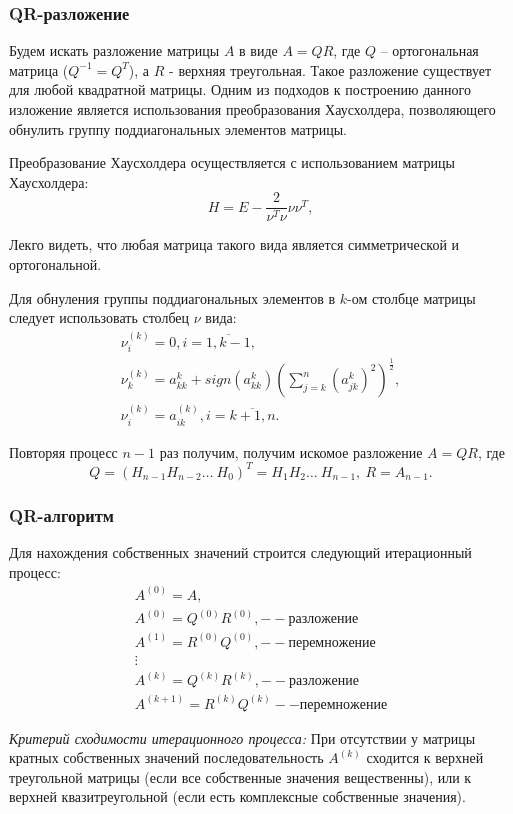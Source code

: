 \documentclass[a4paper,12pt]{article}
\begin{document}
\subsubsection{QR-разложение}
Будем искать разложение матрицы $A$ в виде
$A = QR$, где $Q$ -- ортогональная матрица ($Q^{-1} = Q^{T}$), а
$R$ - верхняя треугольная. Такое разложение существует для любой
квадратной матрицы. Одним из подходов к построению данного
изложение является использования преобразования Хаусхолдера,
позволяющего обнулить группу поддиагональных элементов матрицы.

Преобразование Хаусхолдера осуществляется с использованием
матрицы Хаусхолдера:
$$
H = E - \frac{2}{\nu^{T}\nu} \nu\nu^{T},
$$

Лекго видеть, что любая матрица такого вида является симметрической
и ортогональной.

Для обнуления группы поддиагональных элементов в $k$-ом столбце матрицы следует
использовать столбец $\nu$ вида:
$$
\begin{array}{l}
    \nu^{(k)}_i = 0, i = \overline{1, k - 1}, \\
    \nu^{(k)}_k = a_{kk}^{k} + sign(a_{kk}^{k})
        (\sum_{j = k}^{n}(a^{k}_{jk})^2)^{\frac{1}{2}}, \\
    \nu^{(k)}_i = a_{ik}^{(k)}, i = \overline{k + 1, n}.
\end{array}
$$

Повторяя процесс $n - 1$ раз получим, получим искомое разложение
$A = QR$, где
$$
Q = (H_{n - 1}H_{n -2} \ldots\ H_{0})^T =
H_1 H_2 \ldots\ H_{n - 1},\ R = A_{n - 1}.
$$

\subsubsection{QR-алгоритм}
Для нахождения собственных значений строится следующий итерационный
процесс:
$$
\begin{array}{l}
    A^{(0)} = A, \\
    A^{(0)} = Q^{(0)} R^{(0)}, -- разложение \\
    A^{(1)} = R^{(0)} Q^{(0)}, -- перемножение \\
    \vdots \\
    A^{(k)} = Q^{(k)} R^{(k)}, -- разложение \\
    A^{(k + 1)} = R^{(k)} Q^{(k)} -- перемножение
\end{array}
$$

\textit{Критерий сходимости итерационного процесса:}
При отсутствии у матрицы кратных собственных
значений последовательность $A^{(k)}$ сходится к
верхней треугольной матрицы (если все собственные значения вещественны),
или к верхней квазитреугольной (если есть комплексные собственные
значения).
\end{document}
